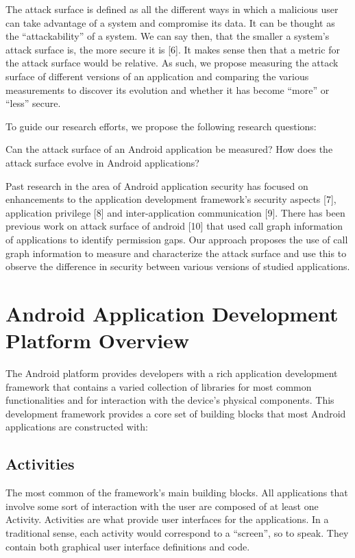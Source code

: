 \documentclass[conference]{IEEEtran}
\begin{document}
The attack surface is defined as all the different ways in which a malicious user can take advantage of a system and compromise its data. It can be thought as the “attackability” of a system. We can say then, that the smaller a system's attack surface is, the more secure it is [6]. It makes sense then that a metric for the attack surface would be relative. As such, we propose measuring the attack surface of different versions of an application and comparing the various measurements to discover its evolution and whether it has become “more” or “less” secure.

To guide our research efforts, we propose the following research questions:

Can the attack surface of an Android application be measured?
How does the attack surface evolve in Android applications?

Past research in the area of Android application security has focused on enhancements to the application development framework's security aspects [7], application privilege [8] and inter-application communication [9]. There has been previous work on attack surface of android [10] that used call graph information of applications to identify permission gaps. Our approach proposes the use of call graph information to measure and characterize the attack surface and use this to observe the difference in security between various versions of studied applications.

\section{Android Application Development Platform Overview}

The Android platform provides developers with a rich application development framework that contains a varied collection of libraries for most common functionalities and for interaction with the device's physical components. This development framework provides a core set of building blocks that most Android applications are constructed with:

\subsection{Activities}

The most common of the framework's main building blocks. All applications that involve some sort of interaction with the user are composed of at least one Activity. Activities are what provide user interfaces for the applications. In a traditional sense, each activity would correspond to a “screen”, so to speak. They contain both graphical user interface definitions and code.
\end{document}
